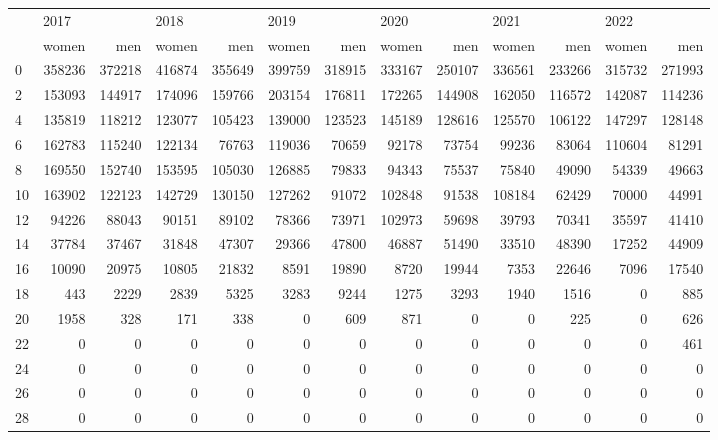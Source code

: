 \begin{tabular}{lrrrrrrrrrrrr}
\toprule
{} & \multicolumn{2}{l}{2017} & \multicolumn{2}{l}{2018} & \multicolumn{2}{l}{2019} & \multicolumn{2}{l}{2020} & \multicolumn{2}{l}{2021} & \multicolumn{2}{l}{2022} \\
{} &   women &     men &   women &     men &   women &     men &   women &     men &   women &     men &   women &     men \\
\midrule
0  &  358236 &  372218 &  416874 &  355649 &  399759 &  318915 &  333167 &  250107 &  336561 &  233266 &  315732 &  271993 \\
2  &  153093 &  144917 &  174096 &  159766 &  203154 &  176811 &  172265 &  144908 &  162050 &  116572 &  142087 &  114236 \\
4  &  135819 &  118212 &  123077 &  105423 &  139000 &  123523 &  145189 &  128616 &  125570 &  106122 &  147297 &  128148 \\
6  &  162783 &  115240 &  122134 &   76763 &  119036 &   70659 &   92178 &   73754 &   99236 &   83064 &  110604 &   81291 \\
8  &  169550 &  152740 &  153595 &  105030 &  126885 &   79833 &   94343 &   75537 &   75840 &   49090 &   54339 &   49663 \\
10 &  163902 &  122123 &  142729 &  130150 &  127262 &   91072 &  102848 &   91538 &  108184 &   62429 &   70000 &   44991 \\
12 &   94226 &   88043 &   90151 &   89102 &   78366 &   73971 &  102973 &   59698 &   39793 &   70341 &   35597 &   41410 \\
14 &   37784 &   37467 &   31848 &   47307 &   29366 &   47800 &   46887 &   51490 &   33510 &   48390 &   17252 &   44909 \\
16 &   10090 &   20975 &   10805 &   21832 &    8591 &   19890 &    8720 &   19944 &    7353 &   22646 &    7096 &   17540 \\
18 &     443 &    2229 &    2839 &    5325 &    3283 &    9244 &    1275 &    3293 &    1940 &    1516 &       0 &     885 \\
20 &    1958 &     328 &     171 &     338 &       0 &     609 &     871 &       0 &       0 &     225 &       0 &     626 \\
22 &       0 &       0 &       0 &       0 &       0 &       0 &       0 &       0 &       0 &       0 &       0 &     461 \\
24 &       0 &       0 &       0 &       0 &       0 &       0 &       0 &       0 &       0 &       0 &       0 &       0 \\
26 &       0 &       0 &       0 &       0 &       0 &       0 &       0 &       0 &       0 &       0 &       0 &       0 \\
28 &       0 &       0 &       0 &       0 &       0 &       0 &       0 &       0 &       0 &       0 &       0 &       0 \\
\bottomrule
\end{tabular}
